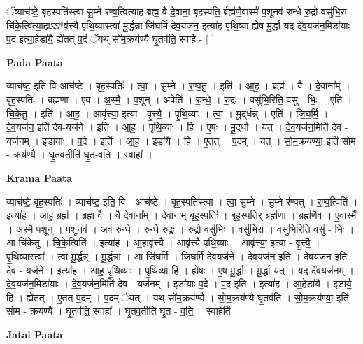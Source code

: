 \documentclass[17pt]{extarticle}
\begin{document}
ॅव्याच॑ष्टे॒ बृह॒स्पति॑स्त्वा सु॒म्ने र॑ण्व॒त्वित्या॑ह॒ ब्रह्म॒ वै दे॒वानां॒ बृह॒स्पति॒-र्ब्रह्म॑णै॒वास्मै॑ प॒शूनव॑ रुन्धे रु॒द्रो वसु॑भि॒रा चि॑के॒त्वित्या॒हाऽऽ*वृ॑त्त्यै पृथि॒व्यास्त्वा॑ मू॒र्द्धन्ना जि॑घर्मि देव॒यज॑न॒ इत्या॑ह पृथि॒व्या ह्ये॑ष मू॒र्द्धा यद्-दे॑व॒यज॑न॒मिडा॑याः प॒द इत्या॒हेडा॑यै॒ ह्ये॑तत् प॒दं ॅयथ् सो॑म॒क्रय॑ण्यै घृ॒तव॑ति॒ स्वाहे - [  ] \newline

\textbf{Pada Paata} \newline

व्याच॑ष्ट॒ इति॑ वि-आच॑ष्टे । बृह॒स्पतिः॑ । त्वा॒ । सु॒म्ने । र॒ण्व॒तु॒ । इति॑ । आ॒ह॒ । ब्रह्म॑ । वै । दे॒वाना᳚म् । बृह॒स्पतिः॑ । ब्रह्म॑णा । ए॒व । अ॒स्मै॒ । प॒शून् । अवेति॑ । रु॒न्धे॒ । रु॒द्रः । वसु॑भि॒रिति॒ वसु॑ - भिः॒ । एति॑ । चि॒के॒तु॒ । इति॑ । आ॒ह॒ । आवृ॑त्त्या॒ इत्या - वृ॒त्त्यै॒ । पृ॒थि॒व्याः । त्वा॒ । मू॒द्‌र्धन्न् । एति॑ । जि॒घ॒र्मि॒ । दे॒व॒यज॑न॒ इति॑ देव-यज॑ने । इति॑ । आ॒ह॒ । पृ॒थि॒व्याः । हि । ए॒षः । मू॒द्‌र्धा । यत् । दे॒व॒यज॑न॒मिति॑ देव - यज॑नम् । इडा॑याः । प॒दे । इति॑ । आ॒ह॒ । इडा॑यै । हि । ए॒तत् । प॒दम् । यत् । सो॒म॒क्रय॑ण्या॒ इति॑ सोम - क्रय॑ण्यै । घृ॒तव॒तीति॑ घृ॒त-व॒ति॒ । स्वाहा᳚ ।  \newline


\textbf{Krama Paata} \newline

व्याच॑ष्टे॒ बृह॒स्पतिः॑ । व्याच॑ष्ट॒ इति॒ वि - आच॑ष्टे । बृह॒स्पति॑स्त्वा । त्वा॒ सु॒म्ने । सु॒म्ने र॑ण्वतु । र॒ण्व॒त्विति॑ । इत्या॑ह । आ॒ह॒ ब्रह्म॑ । ब्रह्म॒ वै । वै दे॒वाना᳚म् । दे॒वाना॒म् बृह॒स्पतिः॑ । बृह॒स्पति॒र् ब्रह्म॑णा । ब्रह्म॑णै॒व । ए॒वास्मै᳚ । अ॒स्मै॒ प॒शून् । प॒शूनव॑ । अव॑ रुन्धे । रु॒न्धे॒ रु॒द्रः । रु॒द्रो वसु॑भिः । वसु॑भि॒रा । वसु॑भि॒रिति॒ वसु॑ - भिः॒ । आ चि॑केतु । चि॒के॒त्विति॑ । इत्या॑ह । आ॒हावृ॑त्त्यै । आवृ॑त्त्यै पृथि॒व्याः । आवृ॑त्त्या॒ इत्या - वृ॒त्त्यै॒ । पृ॒थि॒व्यास्त्वा᳚ । त्वा॒ मू॒र्द्धन्न् । मू॒र्द्धन्ना । आ जि॑घर्मि । जि॒घ॒र्मि॒ दे॒व॒यज॑ने । दे॒व॒यज॑न॒ इति॑ । दे॒व॒यज॑न॒ इति॑ देव - यज॑ने । इत्या॑ह । आ॒ह॒ पृ॒थि॒व्याः । पृ॒थि॒व्या हि । ह्ये॑षः । ए॒ष मू॒र्द्धा । मू॒र्द्धा यत् । यद् दे॑व॒यज॑नम् । दे॒व॒यज॑न॒मिडा॑याः । दे॒व॒यज॑न॒मिति॑ देव - यज॑नम् । इडा॑याः प॒दे । प॒द इति॑ । इत्या॑ह । आ॒हेडा॑यै । इडा॑यै॒ हि । ह्ये॑तत् । ए॒तत् प॒दम् । प॒दम् ॅयत् । यथ् सो॑म॒क्रय॑ण्यै । सो॒म॒क्रय॑ण्यै घृ॒तव॑ति । सो॒म॒क्रय॑ण्या॒ इति॑ सोम - क्रय॑ण्यै । घृ॒तव॑ति॒ स्वाहा᳚ । घृ॒तव॒तीति॑ घृ॒त - व॒ति॒ । स्वाहेति॑ \newline

\textbf{Jatai Paata} \newline
\end{document}
